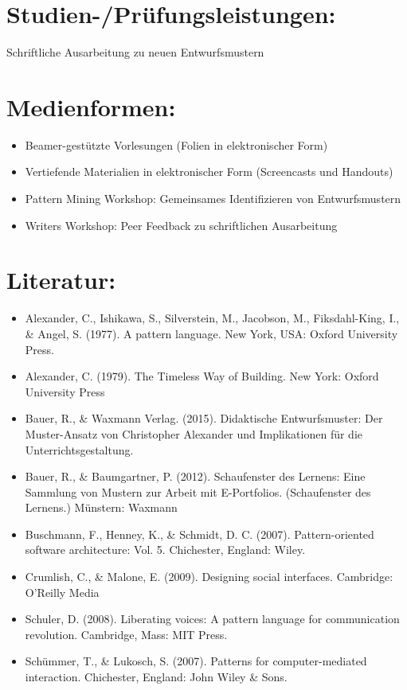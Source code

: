\section*{Studien-/Prüfungsleistungen:}\label{studien-pruxfcfungsleistungen-12}

Schriftliche Ausarbeitung zu neuen Entwurfsmustern

\section*{Medienformen:}\label{medienformen-12}

\begin{itemize}
\item
  Beamer-gestützte Vorlesungen (Folien in elektronischer Form)
\item
  Vertiefende Materialien in elektronischer Form (Screencasts und
  Handouts)
\item
  Pattern Mining Workshop: Gemeinsames Identifizieren von
  Entwurfsmustern
\item
  Writers Workshop: Peer Feedback zu schriftlichen Ausarbeitung
\end{itemize}

\section*{Literatur:}\label{literatur-9}

\begin{itemize}
\item
  Alexander, C., Ishikawa, S., Silverstein, M., Jacobson, M.,
  Fiksdahl-King, I., \& Angel, S. (1977). A pattern language. New York,
  USA: Oxford University Press.
\item
  Alexander, C. (1979). The Timeless Way of Building. New York: Oxford
  University Press
\item
  Bauer, R., \& Waxmann Verlag. (2015). Didaktische Entwurfsmuster: Der
  Muster-Ansatz von Christopher Alexander und Implikationen für die
  Unterrichtsgestaltung.
\item
  Bauer, R., \& Baumgartner, P. (2012). Schaufenster des Lernens: Eine
  Sammlung von Mustern zur Arbeit mit E-Portfolios. (Schaufenster des
  Lernens.) Münstern: Waxmann
\item
  Buschmann, F., Henney, K., \& Schmidt, D. C. (2007). Pattern-oriented
  software architecture: Vol. 5. Chichester, England: Wiley.
\item
  Crumlish, C., \& Malone, E. (2009). Designing social interfaces.
  Cambridge: O'Reilly Media
\item
  Schuler, D. (2008). Liberating voices: A pattern language for
  communication revolution. Cambridge, Mass: MIT Press.
\item
  Schümmer, T., \& Lukosch, S. (2007). Patterns for computer-mediated
  interaction. Chichester, England: John Wiley \& Sons.
\end{itemize}

